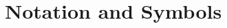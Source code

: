 \documentclass[11pt,a4paper]{article}
\theoremstyle{definition}
\begin{document}







\section{Notation and Symbols}
\label{sec:bbb-notation}
\end{document}
